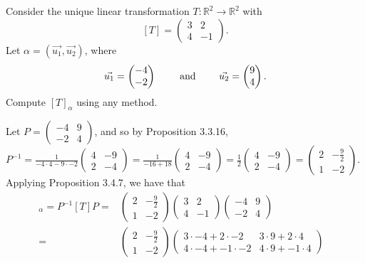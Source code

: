 \documentclass[12pt]{article}
\newenvironment{problem}[2][Problem]
{
	\begin{trivlist} 
		\item[\hskip \labelsep {\bfseries #1 #2:}]
	}
{
	\end{trivlist}
	}
\newenvironment{solution}[1][Solution]
{
	\begin{trivlist} 
		\item[\hskip \labelsep {\itshape #1:}]
	}
	{
	\end{trivlist}
}
\begin{document}
\newpage
\begin{problem}{4}
Consider the unique linear transformation $T:\mathbb{R}^2 \to \mathbb{R}^2$ with
\[
[T]=\begin{pmatrix}3&2\\4&-1\end{pmatrix}\text{.}
\]
Let $\alpha=(\vec{u_{1}},\vec{u_{2}})$, where
\[
\vec{u_{1}}=\begin{pmatrix}-4\\-2\end{pmatrix} \hphantom{1000} \text{ and } \hphantom{1000} \vec{u_{2}}=\begin{pmatrix}9\\4\end{pmatrix} \text{.}
\]
Compute $[T]_{\alpha}$ using any method.
\noindent
\newline
\newline
\begin{solution}
Let $P=\begin{pmatrix}-4 & 9\\-2&4\end{pmatrix}$, and so by Proposition 3.3.16, $P^{-1} = \frac{1}{-4\cdot 4 - 9\cdot -2} \begin{pmatrix} 4&-9\\2&-4\end{pmatrix} = \frac{1}{-16+18}\begin{pmatrix} 4&-9\\2&-4\end{pmatrix} = \frac{1}{2} \begin{pmatrix} 4&-9\\2&-4\end{pmatrix} = \begin{pmatrix} 2&-\frac{9}{2}\\1&-2\end{pmatrix}$. Applying Proposition 3.4.7, we have that 
\begin{align*}
[T]_{\alpha} = P^{-1} [T]P =& \begin{pmatrix} 2&-\frac{9}{2}\\1&-2\end{pmatrix}\begin{pmatrix}3&2\\4&-1\end{pmatrix}\begin{pmatrix}-4 & 9\\-2&4\end{pmatrix} &\\
=&\begin{pmatrix} 2&-\frac{9}{2}\\1&-2\end{pmatrix}\begin{pmatrix}3\cdot -4 + 2\cdot -2& 3\cdot 9 + 2\cdot4\\4\cdot -4 + -1\cdot -2&4\cdot 9 + -1\cdot 4\end{pmatrix} &\\

\end{align*}
\end{solution}
\end{problem}
\end{document}
